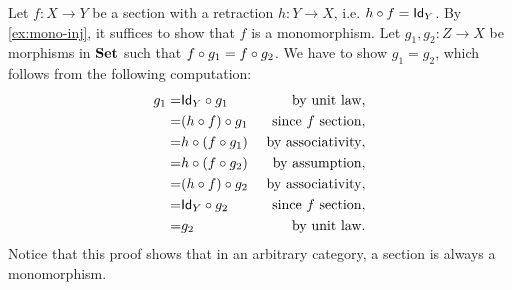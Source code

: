 \begin{solution}\label{sol:sections_in_set_injective}
Let $f:X\to Y$ be a section with a retraction $h:Y\to X$, i.e. $\co{f}{h} = \Id[Y]$. By \cref{ex:mono-inj}, it suffices to show that $f$ is a monomorphism. Let  $g_1, g_2 : Z \to X$ be morphisms in $\SET$ such that $\co{g_1}{f} = \co{g_2}{f}$. We have to show $g_1=g_2$, which follows from the following computation:
\begin{eqnarray*}
g_1 =& \co{g_1}{\Id[Y]} & \text{ by unit law},\\ 
	=& \co{g_1}{(\co{f}{h})} & \text{ since $f$ section},\\ 
	=& \co{(\co{g_1}{f})}{h} & \text{ by associativity},\\
	=&  \co{(\co{g_2}{f})}{h} & \text{ by assumption},\\
	=& \co{g_2}{(\co{f}{h})} & \text{ by associativity},\\ 
	=& \co{g_2}{\Id[Y]} & \text{ since $f$ section},\\
	=& g_2 & \text{ by unit law}.
\end{eqnarray*}
Notice that this proof shows that in an arbitrary category, a section is always a monomorphism.
\end{solution}

